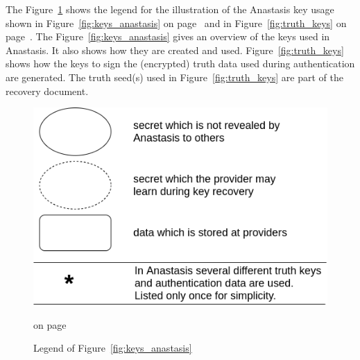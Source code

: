 The Figure~\ref{fig:legend_keys_anastasis} shows the legend for the
illustration of the Anastasis key usage shown in Figure~\ref{fig:keys_anastasis}
on page~\pageref{fig:keys_anastasis} and in
Figure~\ref{fig:truth_keys} on page~\pageref{fig:truth_keys}.
The Figure~\ref{fig:keys_anastasis} gives an overview of the keys used in Anastasis. It also shows how they are created and used.
Figure~\ref{fig:truth_keys} shows how the keys to sign the (encrypted) truth
data used during authentication are generated. The truth seed(s) used in
Figure~\ref{fig:truth_keys} are part of the recovery document.
\newline
\begin{figure}[H]
	\centering
	\includegraphics[scale=0.48]{images/legend_keys_anastasis.png}
	\caption{Legend of Figure~\ref{fig:keys_anastasis}} on page~\pageref{fig:keys_anastasis}
	\label{fig:legend_keys_anastasis}
\end{figure}


